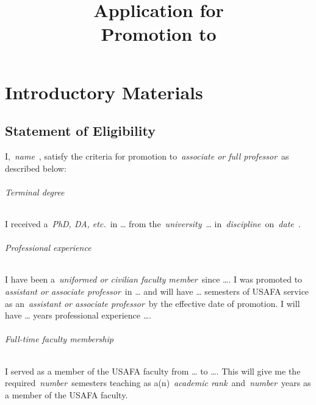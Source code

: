 \documentclass[11pt]{report}
\title{Application for\\Promotion to \meta{Academic Rank}}
\author{\meta{Applicant Name}}
\date{\meta{Semester of Application}}
\providecommand*{\meta}[1]{%
  \textlangle\,\emph{#1}\,\textrangle%
}
\begin{document}
\maketitle

\tableofcontents
\clearpage
{}


\part{Introductory Materials}\label{part:introduction}  %

\chapter{Statement of Eligibility}\label{section:eligibility}  %

I, \meta{name}, satisfy the criteria for promotion to \meta{associate or full professor} as described below:

\paragraph{Terminal degree}
I received a \meta{PhD, DA, etc.} in \dots{} from the \meta{university} \dots{} in \meta{discipline} on \meta{date}.

\paragraph{Professional experience}
I have been a \meta{uniformed or civilian faculty member} since \dots.
I was promoted to \meta{assistant or associate professor} in \dots{} and will have \dots{} semesters of USAFA service as an \meta{assistant or associate professor} by the effective date of promotion.
I will have \dots{} years professional experience \dots.

\paragraph{Full-time faculty membership}
I served as a member of the USAFA faculty from \dots{} to \dots.
This will give me the required \meta{number} semesters teaching as a(n) \meta{academic rank} and \meta{number} years as a member of the USAFA faculty.
\end{document}
